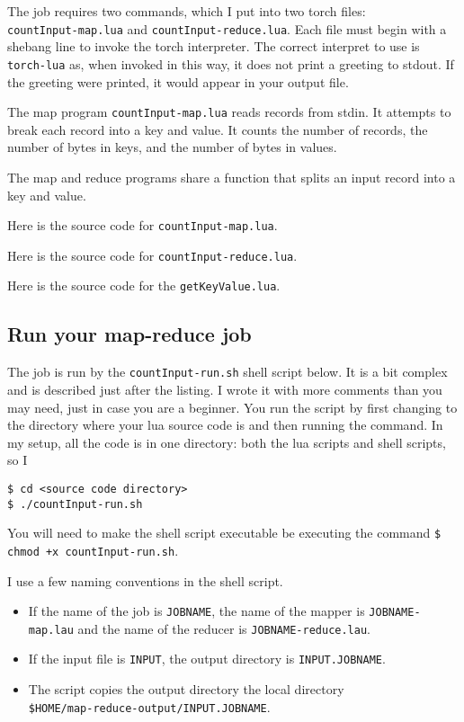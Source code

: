 \documentclass{article}
\let\code\texttt %
\begin{document}
{The job requires two commands, which I put into two torch files:\\
\code{countInput-map.lua} and \code{countInput-reduce.lua}. Each file
must begin with a shebang line to invoke the torch interpreter. The
correct interpret to use is \code{torch-lua} as, when invoked in this
way, it does not print a greeting to stdout. If the greeting were
printed, it would appear in your output file.

The map program \code{countInput-map.lua} reads records from stdin. It
attempts to break each record into a key and value. It counts the number
of records, the number of bytes in keys, and the number of bytes in
values.

The map and reduce programs share a function that splits an input record
into a key and value.

Here is the source code for \code{countInput-map.lua}.




Here is the source code for \code{countInput-reduce.lua}.




Here is the source code for the \code{getKeyValue.lua}.



\subsection{Run your map-reduce job}

The job is run by the \code{countInput-run.sh} shell script below. It is
a bit complex and is described just after the listing. I wrote it with
more comments than you may need, just in case you are a beginner. You
run the script by first changing to the directory where your lua source
code is and then running the command. In my setup, all the code is in
one directory: both the lua scripts and shell scripts, so I 

\begin{verbatim}
$ cd <source code directory>
$ ./countInput-run.sh
\end{verbatim}

You will need to make the shell script executable be executing the
command \code{\$ chmod +x countInput-run.sh}. 

I use a few naming conventions in the shell script.
\begin{itemize}
  \item If the name of the job is \code{JOBNAME}, the name of the mapper
    is \code{JOBNAME-map.lau} and the name of the reducer is
    \code{JOBNAME-reduce.lau}.
  \item If the input file is \code{INPUT}, the output directory is
    \code{INPUT.JOBNAME}.
  \item The script copies the output directory the local directory\\
    \code{\$HOME/map-reduce-output/INPUT.JOBNAME}.
\end{itemize}

}
\end{document}
